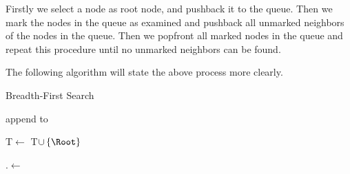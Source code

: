 \begin{questions}
\begin{algorithm}
{            
            
        }

    \end{algorithm}

    Firstly we select a node as root node, and pushback it to the queue. Then we mark the nodes in the queue as examined and pushback all unmarked neighbors of the nodes in the queue. Then we popfront all marked nodes in the queue and repeat this procedure until no unmarked neighbors can be found.

    The following algorithm will state the above process more clearly.

    \begin{algorithm}[h]
        \caption{Breadth-First Search}
        \label{algo-bfs}

        append \Root to \Queue

        T$\gets$ T$\cup\left\{\Root\right\}$

        \Root.\Visited$\gets$\True




    \end{algorithm}


\end{questions}



